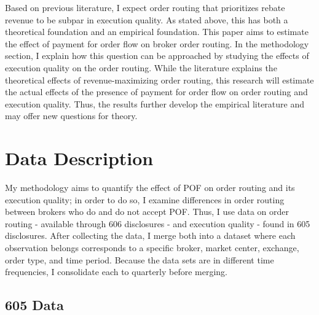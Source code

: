 \documentclass[12pt,a4paper]{article}
\begin{document}
Based on previous literature, I expect order routing that prioritizes rebate revenue to be subpar in execution quality. As stated above, this has both a theoretical foundation and an empirical foundation. This paper aims to estimate the effect of payment for order flow on broker order routing. In the methodology section, I explain how this question can be approached by studying the effects of execution quality on the order routing. While the literature explains the theoretical effects of revenue-maximizing order routing, this research will estimate the actual effects of the presence of payment for order flow on order routing and execution quality. Thus, the results further develop the empirical literature and may offer new questions for theory. 






	
	
\section{Data Description}

	My methodology aims to quantify the effect of POF on order routing and its execution quality; in order to do so, I examine differences in order routing between brokers who do and do not accept POF. Thus, I use data on order routing - available through 606 disclosures - and execution quality - found in 605 disclosures.  After collecting the data, I merge both into a dataset where each observation belongs corresponds to a specific broker, market center, exchange, order type, and time period. Because the data sets are in different time frequencies, I consolidate each to quarterly before merging. 
	
	\subsection{605 Data}
	
\end{document}

